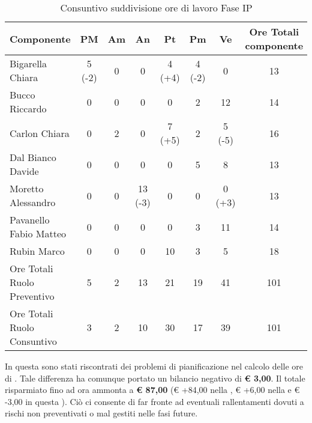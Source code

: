 			\begin{table}[H]
				\begin{center}
					\begin{tabular}{| l | c | c | c | c | c | c | c |}
						\hline
						Componente 					& PM	& Am	& An 	& Pt 		& Pm 		& Ve 	& Ore Totali componente \\ \hline
						
						Bigarella Chiara 			& 5 (-2) & 0	& 0		& 4	(+4)	& 4 (-2)	& 0		& 13 \\
						Bucco Riccardo 				& 0		& 0		& 0		& 0			& 2			& 12 	& 14 \\
						Carlon Chiara	 			& 0		& 2 	& 0		& 7 (+5)	& 2 		& 5 (-5) 	& 16 \\
						Dal Bianco Davide 			& 0		& 0		& 0		& 0			& 5 		& 8 	& 13 \\
						Moretto Alessandro 			& 0		& 0		& 13 (-3) & 0		& 0			& 0	(+3)	& 13 \\
						Pavanello Fabio Matteo	 	& 0		& 0		& 0		& 0			& 3 		&11 	& 14 \\
						Rubin Marco					& 0		& 0 	& 0		& 10 		& 3 		& 5		& 18 \\ \hline \hline
						
						Ore Totali Ruolo Preventivo & 5 	& 2 	& 13 	& 21 		& 19 		& 41 	& 101\\ 
						Ore Totali Ruolo Consuntivo & 3 	& 2 	& 10 	& 30 		& 17 		& 39 	& 101\\ \hline
					\end{tabular}
				\end{center}
				\caption{Consuntivo suddivisione ore di lavoro Fase IP}
			\end{table}

			In questa  sono stati riscontrati dei problemi di pianificazione nel calcolo delle ore di . Tale differenza ha comunque portato un bilancio negativo di \textbf{\euro{} 3,00}.
			Il totale risparmiato fino ad ora ammonta a \textbf{\euro{} 87,00} (\euro{} +84,00 nella , \euro{} +6,00 nella  e \euro{} -3,00 in questa ). Ciò ci consente di far fronte ad eventuali rallentamenti dovuti a rischi non preventivati o mal gestiti nelle fasi future.
	
